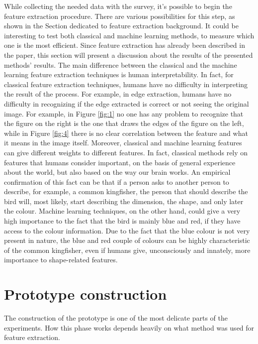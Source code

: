 \documentclass[conference]{IEEEtran}
\begin{document}
		While collecting the needed data with the survey, it's possible to begin the feature extraction procedure. There are various possibilities for this step, as shown in the Section dedicated to feature extraction background. 
		It could be interesting to test both classical and machine learning methods, to measure which one is the most efficient. Since feature extraction has already been described in the paper, this section will 
		present a discussion about the results of the presented methods' results. The main difference between the classical and the machine learning feature extraction techniques is human interpretability. 
		In fact, for classical feature extraction techniques, humans have no difficulty in interpreting the result of the process. For example, in edge extraction, humans have no difficulty in recognizing if the 
		edge extracted is correct or not seeing the original image. For example, in Figure \ref{fig:1} no one has any problem to recognize that the figure on the right is the one that draws the edges of the figure on the left, 
		while in Figure \ref{fig:4} there is no clear correlation between the feature and what it means in the image itself.
		Moreover, classical and machine learning features can give different weights to different features. 
		In fact, classical methods rely on features that humans consider important, on the basis of general experience about the world, but also based on the way our brain works. An empirical confirmation of this fact 
		can be that if a person asks to another person to describe, for example, a common kingfisher, the person that should describe the bird will, most likely, start describing the dimension, the shape, and only 
		later the colour. Machine learning techniques, on the other hand, could give a very high importance to the fact that the bird is mainly blue and red, if they have access to the colour information. Due to the fact that 
		the blue colour is not very present in nature, the blue and red couple of colours can be highly characteristic of the common kingfisher, even if humans give, unconsciously and innately, more importance to 
		shape-related features.	

	\section{Prototype construction}

		The construction of the prototype is one of the most delicate parts of the experiments. How this phase works depends heavily on what method was used for feature extraction. 
		
\end{document}
